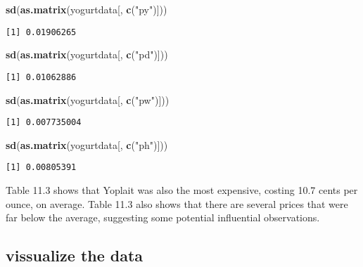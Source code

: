 \documentclass[]{book}
\newenvironment{Shaded}{\begin{snugshade}}{\end{snugshade}}
\newcommand{\KeywordTok}[1]{\textcolor[rgb]{0.13,0.29,0.53}{\textbf{#1}}}
\newcommand{\NormalTok}[1]{#1}
\newcommand{\StringTok}[1]{\textcolor[rgb]{0.31,0.60,0.02}{#1}}
\begin{document}
\begin{Shaded}
\begin{Highlighting}[]
\KeywordTok{sd}\NormalTok{(}\KeywordTok{as.matrix}\NormalTok{(yogurtdata[, }\KeywordTok{c}\NormalTok{(}\StringTok{"py"}\NormalTok{)]))}
\end{Highlighting}
\end{Shaded}

\begin{verbatim}
[1] 0.01906265
\end{verbatim}

\begin{Shaded}
\begin{Highlighting}[]
\KeywordTok{sd}\NormalTok{(}\KeywordTok{as.matrix}\NormalTok{(yogurtdata[, }\KeywordTok{c}\NormalTok{(}\StringTok{"pd"}\NormalTok{)]))}
\end{Highlighting}
\end{Shaded}

\begin{verbatim}
[1] 0.01062886
\end{verbatim}

\begin{Shaded}
\begin{Highlighting}[]
\KeywordTok{sd}\NormalTok{(}\KeywordTok{as.matrix}\NormalTok{(yogurtdata[, }\KeywordTok{c}\NormalTok{(}\StringTok{"pw"}\NormalTok{)]))}
\end{Highlighting}
\end{Shaded}

\begin{verbatim}
[1] 0.007735004
\end{verbatim}

\begin{Shaded}
\begin{Highlighting}[]
\KeywordTok{sd}\NormalTok{(}\KeywordTok{as.matrix}\NormalTok{(yogurtdata[, }\KeywordTok{c}\NormalTok{(}\StringTok{"ph"}\NormalTok{)]))}
\end{Highlighting}
\end{Shaded}

\begin{verbatim}
[1] 0.00805391
\end{verbatim}

Table 11.3 shows that Yoplait was also the most expensive, costing 10.7 cents per ounce, on average. Table 11.3 also shows that there are several prices that were far below the average, suggesting some potential influential observations.

\hypertarget{vissualize-the-data}{%
\subsection{vissualize the data}\label{vissualize-the-data}}
\end{document}
